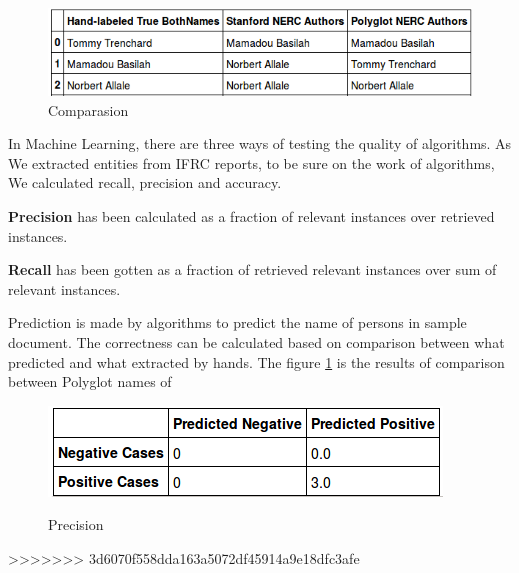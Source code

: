 \begin{figure}[hbtp]
\caption{Comparasion}
\centering
\includegraphics[scale=.8]{images/comparason.png}
\end{figure}


In Machine Learning, there are three ways of testing the quality of algorithms. As We extracted  entities from IFRC reports, to be sure on the work of algorithms,  We calculated recall, precision and accuracy. 

\textbf{Precision} has been calculated as a  fraction of relevant instances over  retrieved instances.

\textbf{Recall} has been gotten as a fraction of retrieved relevant instances over  sum of relevant instances.



Prediction is made by algorithms to predict the name of persons in sample document. The correctness can be calculated based on comparison between what predicted and what extracted by hands. The figure \ref{prediction} is  the results of comparison between Polyglot names of 
\begin{figure}[hbtp]
\caption{Precision}
\centering
\includegraphics[scale=1]{images/precision.png}\label{prediction}
\end{figure}
>>>>>>> 3d6070f558dda163a5072df45914a9e18dfc3afe
